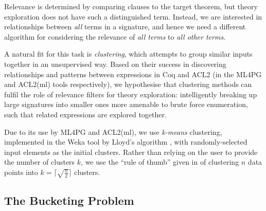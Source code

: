Relevance is determined by comparing clauses to the target theorem, but theory exploration does not have such a distinguished term. Instead, we are interested in relationships between \emph{all} terms in a signature, and hence we need a different algorithm for considering the relevance of \emph{all terms} to \emph{all other terms}.

A natural fit for this task is \emph{clustering}, which attempts to group similar inputs together in an unsupervised way. Based on their success in discovering relationships and patterns between expressions in Coq and ACL2 (in the ML4PG and ACL2(ml) tools respectively), we hypothesise that clustering methods can fulfil the role of relevance filters for theory exploration: intelligently breaking up large signatures into smaller ones more amenable to brute force enumeration, such that related expressions are explored together.

Due to its use by ML4PG and ACL2(ml), we use \emph{k-means} clustering, implemented in the Weka tool \cite{Holmes.Donkin.Witten:1994} by Lloyd's algorithm \cite{lloyd1982least}, with randomly-selected input elements as the initial clusters. Rather than relying on the user to provide the number of clusters $k$, we use the ``rule of thumb'' given in \cite[pp. 365]{mardia1979multivariate} of clustering $n$ data points into $k = \lceil \sqrt{\frac{n}{2}} \rceil$ clusters.

\subsection{The Bucketing Problem}
\label{sec:bucketing}

